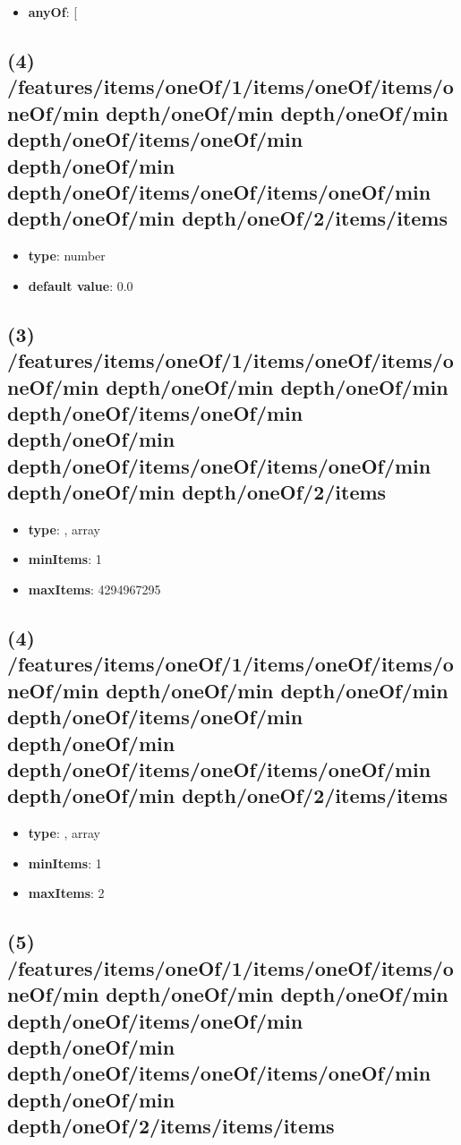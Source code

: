 \begin{itemize}[leftmargin=4em]\item {\bf anyOf}: [\end{itemize}\subsection{(4) /features/items/oneOf/1/items/oneOf/items/oneOf/min depth/oneOf/min depth/oneOf/min depth/oneOf/items/oneOf/min depth/oneOf/min depth/oneOf/items/oneOf/items/oneOf/min depth/oneOf/min depth/oneOf/2/items/items}
\begin{itemize}[leftmargin=4em]\item {\bf type}: number\item {\bf default value}: 0.0
\end{itemize}\subsection{(3) /features/items/oneOf/1/items/oneOf/items/oneOf/min depth/oneOf/min depth/oneOf/min depth/oneOf/items/oneOf/min depth/oneOf/min depth/oneOf/items/oneOf/items/oneOf/min depth/oneOf/min depth/oneOf/2/items}
\begin{itemize}[leftmargin=3em]\item {\bf type}: , array\item {\bf minItems}: 1
\item {\bf maxItems}: 4294967295
\end{itemize}\subsection{(4) /features/items/oneOf/1/items/oneOf/items/oneOf/min depth/oneOf/min depth/oneOf/min depth/oneOf/items/oneOf/min depth/oneOf/min depth/oneOf/items/oneOf/items/oneOf/min depth/oneOf/min depth/oneOf/2/items/items}
\begin{itemize}[leftmargin=4em]\item {\bf type}: , array\item {\bf minItems}: 1
\item {\bf maxItems}: 2
\end{itemize}\subsection{(5) /features/items/oneOf/1/items/oneOf/items/oneOf/min depth/oneOf/min depth/oneOf/min depth/oneOf/items/oneOf/min depth/oneOf/min depth/oneOf/items/oneOf/items/oneOf/min depth/oneOf/min depth/oneOf/2/items/items/items}
